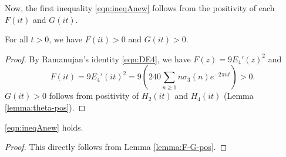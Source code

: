 Now, the first inequality \eqref{eqn:ineqAnew} follows from the positivity of each $F(it)$ and $G(it)$.

\begin{lemma}\label{lemma:F-G-pos}
For all $t > 0$, we have $F(it) > 0$ and $G(it) > 0$.
\end{lemma}
\begin{proof}
By Ramanujan's identity \eqref{eqn:DE4}, we have $F(z) = 9 E_4'(z)^2$ and
\begin{equation}
  F(it) = 9E_4'(it)^2 = 9 \left(240\sum_{n \geq 1} n \sigma_3(n) e^{-2 \pi n t} \right) > 0.
\end{equation}
$G(it) > 0$ follows from positivity of $H_2(it)$ and $H_4(it)$ (Lemma \ref{lemma:theta-pos}).
\end{proof}

\begin{corollary}\label{cor:ineqAnew}
\eqref{eqn:ineqAnew} holds.
\end{corollary}
\begin{proof}
This directly follows from Lemma \ref{lemma:F-G-pos}.
\end{proof}

